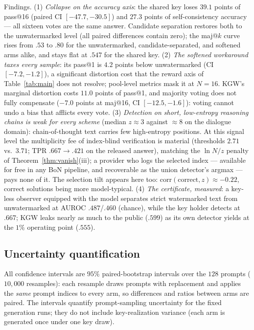 \documentclass{article} %
\begin{document}
Findings. (1) \emph{Collapse on the accuracy axis}: the shared key loses
$39.1$ points of pass@16 (paired CI $[-47.7,-30.5]$) and $27.3$ points of
self-consistency accuracy --- all sixteen votes are the same answer.
Candidate separation restores both to the unwatermarked level (all paired
differences contain zero); the maj@$k$ curve rises from $.53$ to $.80$ for
the unwatermarked, candidate-separated, and softened arms alike, and stays
flat at $.547$ for the shared key.
(2) \emph{The softened workaround taxes every sample}: its pass@1 is
$4.2$ points below unwatermarked (CI $[-7.2,-1.2]$), a significant
distortion cost that the reward axis of Table~\ref{tab:main} does not
resolve; pool-level metrics mask it at $N{=}16$. KGW's marginal distortion
costs $11.0$ points of pass@1, and majority voting does not fully compensate
($-7.0$ points at maj@16, CI $[-12.5,-1.6]$): voting cannot undo a bias that
afflicts every vote.
(3) \emph{Detection on short, low-entropy reasoning chains is weak for
every scheme} (median $z\approx3$ against $\approx8$ on the dialogue
domain): chain-of-thought text carries few high-entropy positions. At this
signal level the multiplicity fee of index-blind verification is material
(thresholds $2.71$ vs.\ $3.71$; TPR $.667\to.421$ on the released answer),
matching the $\ln N/z$ penalty of Theorem~\ref{thm:vanish}(iii); a
provider who logs the selected index --- available for free in any BoN
pipeline, and recoverable as the union detector's argmax --- pays none of
it. The selection tilt appears here too:
$\mathrm{corr}(\text{correct},z)\approx-0.22$, correct solutions being
more model-typical.
(4) \emph{The certificate, measured}: a key-less observer equipped with the
model separates strict watermarked text from unwatermarked at AUROC
$.487$/$.460$ (chance), while the key holder detects at $.667$; KGW leaks
nearly as much to the public ($.599$) as its own detector yields at the
$1\%$ operating point ($.555$).

\subsection{Uncertainty quantification}\label{app:ci}
All confidence intervals are $95\%$ paired-bootstrap intervals over the $128$
prompts ($10{,}000$ resamples): each resample draws prompts with replacement
and applies the \emph{same} prompt indices to every arm, so differences and
ratios between arms are paired. The intervals quantify prompt-sampling
uncertainty for the fixed generation runs; they do not include
key-realization variance (each arm is generated once under one key draw).
\end{document}
